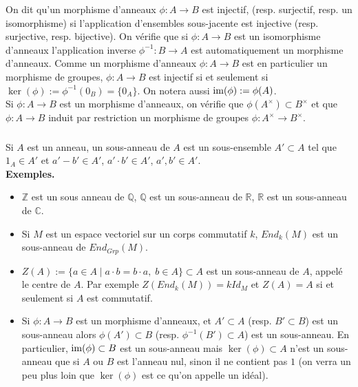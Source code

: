 \documentclass[a4paper, 12pt]{amsart}
\newcommand{\im}{\hbox{\rm im}}
\newcommand{\Q}{\mathbb{Q}}
\newcommand{\C}{\mathbb{C}}
\newcommand{\Z}{\mathbb{Z}}
\newcommand{\R}{\mathbb{R}}
\begin{document}
\noindent On dit qu'un morphisme d'anneaux $\phi:A\rightarrow B$ est injectif, (resp. surjectif, resp. un isomorphisme) si l'application d'ensembles sous-jacente est injective (resp. surjective, resp. bijective). On v\'erifie que si $\phi:A\rightarrow B$ est un isomorphisme d'anneaux l'application inverse $\phi^{-1}:B\rightarrow A$ est automatiquement un morphisme d'anneaux. Comme un morphisme d'anneaux $\phi:A\rightarrow B$ est en particulier un morphisme de groupes, $\phi:A\rightarrow B$ est injectif si et seulement si $\ker(\phi):=\phi^{-1}(0_B)=\lbrace 0_A\rbrace$. On notera aussi $\im(\phi):=\phi(A)$. \\

\noindent Si $\phi:A\rightarrow B$ est un morphisme d'anneaux, on v\'erifie que $\phi(A^\times)\subset B^\times$ et que $\phi:A\rightarrow B$ induit par restriction un morphisme de groupes $\phi:A^\times\rightarrow B^\times$.

\subsubsection{}Si $A$ est un anneau, un sous-anneau de $A$ est un sous-ensemble $A'\subset A$ tel que $1_A\in A'$ et $a'-b'\in A'$, $a'\cdot b'\in A'$, $a',b'\in A'$. \\

\noindent\textbf{Exemples.}
\begin{itemize}[leftmargin=* ,parsep=0cm,itemsep=0cm,topsep=0cm]
\item $\Z$ est un sous anneau de $\Q$, $\Q$ est un sous-anneau de $\R$, $\R$ est un sous-anneau de $\C$. 
\item Si $M$ est un espace vectoriel sur un corps commutatif $k$, $End_k(M)$ est un sous-anneau de $End_{Grp}(M)$. 
\item $Z(A):=\lbrace a\in A\;|\; a\cdot b=b\cdot a,\; b\in A\rbrace\subset A$ est un sous-anneau de $A$, appel\'e le centre de $A$. Par exemple $Z(End_k(M))=kId_M$ et $Z(A)=A$ si et seulement si $A$ est commutatif. 
\item Si $\phi:A\rightarrow B$ est un morphisme d'anneaux, et $A'\subset A$ (resp. $B'\subset B$) est un sous-anneau alors $\phi(A')\subset B$ (resp. $\phi^{-1}(B')\subset A$) est un sous-anneau. En particulier, $\im(\phi)\subset B$ est un sous-anneau mais  $\ker(\phi)\subset A$ n'est un sous-anneau que si $A$ ou $B$ est l'anneau nul, sinon il ne contient pas $1$ (on verra un peu plus loin que $\ker(\phi)$ est ce qu'on appelle un id\'eal).
\end{itemize}
\end{document}
